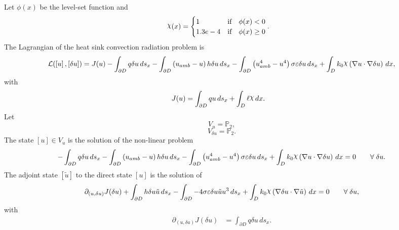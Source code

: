 \documentclass[preview]{standalone}
\let\oldcdot\cdot
\let\cdot\oldcdot
\begin{document}
Let $\phi(x)$ be the level-set function and
 \begin{align*}\raisebox{\depth}{$\chi$}(x) &= \begin{cases} 1 & \mbox{if}\quad \phi(x) < 0 \\ 1.3e-4 & \mbox{if}\quad \phi(x)  \ge 0 \end{cases}.\end{align*}
The Lagrangian of the heat sink convection radiation problem is
\begin{dmath*}
\mathcal L(\left[ u\right],\left[ \delta u\right]) = J(u) -  \int_{\partial D} q \delta u \,ds_x -  \int_{\partial D} \left(u_{amb} - u\right) h \delta u \,ds_x -  \int_{\partial D} \left(u_{amb}^{4} - u^{4}\right) \sigma \varepsilon \delta u \,ds_x +  \int_{D} k_{0} \raisebox{\depth}{$\chi$} \left(  \nabla u  \cdot  \nabla \delta u  \right) \,dx , 
\end{dmath*}
with 
\begin{align*}
J(u) &=  \int_{\partial D} q u \,ds_x +  \int_{D} \ell \raisebox{\depth}{$\chi$} \,dx.
 \end{align*}
Let
\begin{equation*}
V_{u} = \mathbb P_{2},\end{equation*}
\begin{equation*}
V_{\delta u} = \mathbb P_{2}.\end{equation*}
The state $\left[ u\right] \in  V_{u}$ is the solution of the non-linear problem
\begin{dmath*}
-  \int_{\partial D} q \delta u \,ds_x -  \int_{\partial D} \left(u_{amb} - u\right) h \delta u \,ds_x -  \int_{\partial D} \left(u_{amb}^{4} - u^{4}\right) \sigma \varepsilon \delta u \,ds_x +  \int_{D} k_{0} \raisebox{\depth}{$\chi$} \left(  \nabla u  \cdot  \nabla \delta u  \right) \,dx = 0\qquad \forall\; \delta u . 
\end{dmath*}
The adjoint state $\left[ \tilde u\right]$ to the direct state $\left[ u\right]$ is the solution of
\begin{dmath*}
\partial_{(u,\delta u)} J(\delta u) +  \int_{\partial D} h \delta u \tilde u \,ds_x -  \int_{\partial D} - 4 \sigma \varepsilon \delta u \tilde u u^{3} \,ds_x +  \int_{D} k_{0} \raisebox{\depth}{$\chi$} \left(  \nabla \delta u  \cdot  \nabla \tilde u  \right) \,dx = 0\qquad \forall\; \delta u , 
\end{dmath*}
with 
\begin{align*}
\partial_{(u,\delta u)} J(\delta u) &=  \int_{\partial D} q \delta u \,ds_x.
 \end{align*}
\end{document}
